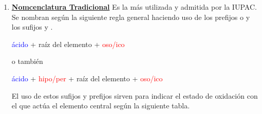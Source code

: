 \documentclass[12pt]{article}
\begin{document}
\begin{enumerate}[label=\numberballgreen]
    \item \textbf{\uline{Nomcenclatura Tradicional}} Es la más utilizada y admitida por la IUPAC. Se nombran según la siguiente regla general haciendo uso de los prefijos  o  y los sufijos  y .
          \begin{center}
              \textcolor{blue}{ácido} + \textcolor{mygreen}{raíz del elemento} + \textcolor{red}{oso/ico}\par
              o también\par
              \textcolor{blue}{ácido} + \textcolor{red}{hipo/per} + \textcolor{mygreen}{raíz del elemento} + \textcolor{red}{oso/ico}
          \end{center}

          El uso de estos sufijos y prefijos sirven para indicar el estado de oxidación con el que actúa el elemento central según la siguiente tabla.


\end{enumerate}
\end{document}
